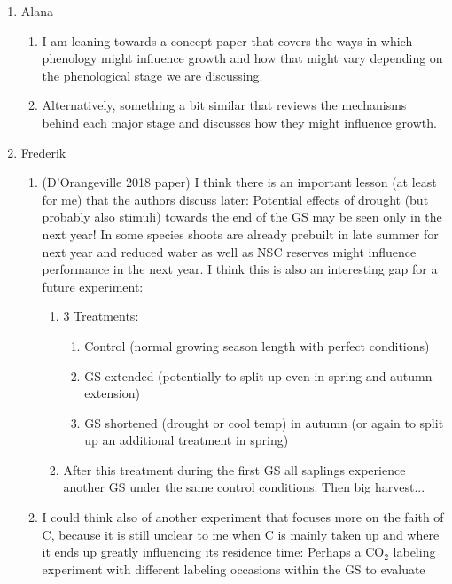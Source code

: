 \documentclass[11pt,letter]{article}
\begin{document}
\begin{enumerate}
\item Alana
\begin{enumerate}
\item I am leaning towards a concept paper that covers the ways in which phenology might influence growth and how that might vary depending on the phenological stage we are discussing. 
\item Alternatively, something a bit similar that reviews the mechanisms behind each major stage and discusses how they might influence growth.
\end{enumerate}
\item Frederik
\begin{enumerate}
\item (D'Orangeville 2018 paper) I think there is an important lesson (at least for me) that the authors discuss later: Potential effects of drought (but probably also stimuli) towards the end of the GS may be seen only in the next year! In some species shoots are already prebuilt in late summer for next year and reduced water as well as NSC reserves might influence performance in the next year. I think this is also an interesting gap for a future experiment:
\begin{enumerate}
\item 3 Treatments:
\begin{enumerate}
\item Control (normal growing season length with perfect conditions)
\item GS extended (potentially to split up even in spring and autumn extension)
\item GS shortened (drought or cool temp) in autumn (or again to split up an additional treatment in spring)
\end{enumerate}
\item After this treatment during the first GS all saplings experience another GS under the same control conditions. Then big harvest...
\end{enumerate}
\item I could think also of another experiment that focuses more on the faith of C, because it is still unclear to me when C is mainly taken up and where it ends up greatly influencing its residence time: Perhaps a CO$_2$ labeling experiment with different labeling occasions within the GS to evaluate
\begin{enumerate}

\end{enumerate}
\end{enumerate}
\end{enumerate}
\end{document}
